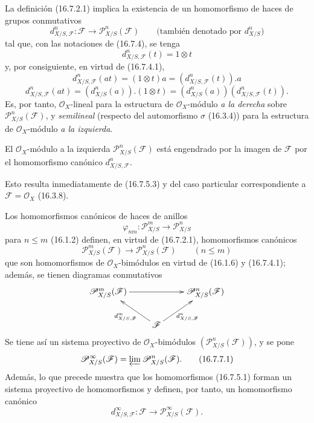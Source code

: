 \begin{env}[16.7.5]
\label{IV.16.7.5}
La definición (16.7.2.1) implica la existencia de un homomorfismo de haces
de grupos conmutativos
\[
  d_{X/S,\mathscr{F}}^n:\mathscr{F}
  \longrightarrow\mathscr{P}_{X/S}^n(\mathscr{F})
  \qquad\text{(también denotado por $d_{X/S}^n$)}
  \tag{16.7.5.1}
  \label{IV.16.7.5.1}
\]
tal que, con las notaciones de (16.7.4), se tenga
\[
  d_{X/S,\mathscr{F}}^n(t)=1\otimes t
  \tag{16.7.5.2}
  \label{IV.16.7.5.2}
\]
y, por consiguiente, en virtud de (16.7.4.1),
\[
  d_{X/S,\mathscr{F}}^n(at)
  =(1\otimes t)a=(d_{X/S,\mathscr{F}}^n(t)).a
  \tag{16.7.5.3}
  \label{IV.16.7.5.3}
\]
\[
  d_{X/S,\mathscr{F}}^n(at)
  =(d_{X/S}^n(a)).(1\otimes t)
  =(d_{X/S}^n(a))(d_{X/S,\mathscr{F}}^n(t)).
  \tag{16.7.5.4}
  \label{IV.16.7.5.4}
\]
Es, por tanto, $\mathcal{O}_X$-lineal para la estructura de
$\mathcal{O}_X$-módulo \emph{a la derecha} sobre $\mathscr{P}_{X/S}^n(\mathscr{F})$, y
\emph{semilineal} (respecto del automorfismo $\sigma$ (16.3.4)) para
la estructura de $\mathcal{O}_X$-módulo \emph{a la izquierda}.
\end{env}

\begin{proposition}[16.7.6]
\label{IV.16.7.6}
El $\mathcal{O}_X$-módulo a la izquierda $\mathscr{P}_{X/S}^n(\mathscr{F})$ está
engendrado por la imagen de $\mathscr{F}$ por el homomorfismo canónico
$d_{X/S,\mathscr{F}}^n$.
\end{proposition}

Esto resulta inmediatamente de (16.7.5.3) y del caso particular correspondiente a
$\mathscr{F}=\mathcal{O}_X$ (16.3.8).

\begin{env}[16.7.7]
\label{IV.16.7.7}
Los homomorfismos canónicos de haces de anillos
\[
  \varphi_{nm}:\mathscr{P}_{X/S}^m\longrightarrow\mathscr{P}_{X/S}^n
\]
para $n\leq m$ (16.1.2) definen, en virtud de (16.7.2.1),
homomorfismos canónicos
\[
  \mathscr{P}_{X/S}^m(\mathscr{F})
  \longrightarrow\mathscr{P}_{X/S}^n(\mathscr{F})\qquad(n\leq m)
\]
que son homomorfismos de $\mathcal{O}_X$-bimódulos en virtud de (16.1.6)
y (16.7.4.1); además, se tienen diagramas conmutativos
\[
  \xymatrix{
    \mathscr{P}_{X/S}^m(\mathscr{F})\ar[rr]
      &&\mathscr{P}_{X/S}^n(\mathscr{F})\\
    &\mathscr{F}\ar[ul]^-{d_{X/S,\mathscr{F}}^m}
      \ar[ur]_-{d_{X/S,\mathscr{F}}^n}
  }
\]
Se tiene así un sistema proyectivo de $\mathcal{O}_X$-bimódulos
$(\mathscr{P}_{X/S}^n(\mathscr{F}))$, y se pone
\[
  \mathscr{P}_{X/S}^{\infty}(\mathscr{F})
  =\varprojlim\mathscr{P}_{X/S}^n(\mathscr{F}).
  \tag{16.7.7.1}
  \label{IV.16.7.7.1}
\]
Además, lo que precede muestra que los homomorfismos (16.7.5.1) forman un
sistema proyectivo de homomorfismos y definen, por tanto, un homomorfismo
canónico
\[
  d_{X/S,\mathscr{F}}^{\infty}:\mathscr{F}
  \longrightarrow\mathscr{P}_{X/S}^{\infty}(\mathscr{F}).
  \tag{16.7.7.2}
  \label{IV.16.7.7.2}
\]
\end{env}

